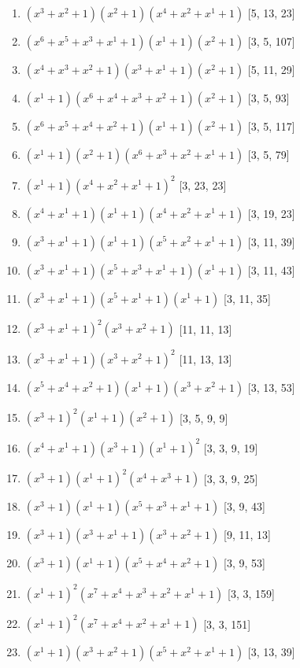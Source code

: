 \documentclass[10pt,twocolumn]{article}
\begin{document}
\begin{enumerate}
\item $(x^{3} + x^{2} + 1)(x^{2} + 1)(x^{4} + x^{2} + x^{1} + 1)$  [5, 13, 23]
\item $(x^{6} + x^{5} + x^{3} + x^{1} + 1)(x^{1} + 1)(x^{2} + 1)$  [3, 5, 107]
\item $(x^{4} + x^{3} + x^{2} + 1)(x^{3} + x^{1} + 1)(x^{2} + 1)$  [5, 11, 29]
\item $(x^{1} + 1)(x^{6} + x^{4} + x^{3} + x^{2} + 1)(x^{2} + 1)$  [3, 5, 93]
\item $(x^{6} + x^{5} + x^{4} + x^{2} + 1)(x^{1} + 1)(x^{2} + 1)$  [3, 5, 117]
\item $(x^{1} + 1)(x^{2} + 1)(x^{6} + x^{3} + x^{2} + x^{1} + 1)$  [3, 5, 79]
\item $(x^{1} + 1)(x^{4} + x^{2} + x^{1} + 1)^{2}$  [3, 23, 23]
\item $(x^{4} + x^{1} + 1)(x^{1} + 1)(x^{4} + x^{2} + x^{1} + 1)$  [3, 19, 23]
\item $(x^{3} + x^{1} + 1)(x^{1} + 1)(x^{5} + x^{2} + x^{1} + 1)$  [3, 11, 39]
\item $(x^{3} + x^{1} + 1)(x^{5} + x^{3} + x^{1} + 1)(x^{1} + 1)$  [3, 11, 43]
\item $(x^{3} + x^{1} + 1)(x^{5} + x^{1} + 1)(x^{1} + 1)$  [3, 11, 35]
\item $(x^{3} + x^{1} + 1)^{2}(x^{3} + x^{2} + 1)$  [11, 11, 13]
\item $(x^{3} + x^{1} + 1)(x^{3} + x^{2} + 1)^{2}$  [11, 13, 13]
\item $(x^{5} + x^{4} + x^{2} + 1)(x^{1} + 1)(x^{3} + x^{2} + 1)$  [3, 13, 53]
\item $(x^{3} + 1)^{2}(x^{1} + 1)(x^{2} + 1)$  [3, 5, 9, 9]
\item $(x^{4} + x^{1} + 1)(x^{3} + 1)(x^{1} + 1)^{2}$  [3, 3, 9, 19]
\item $(x^{3} + 1)(x^{1} + 1)^{2}(x^{4} + x^{3} + 1)$  [3, 3, 9, 25]
\item $(x^{3} + 1)(x^{1} + 1)(x^{5} + x^{3} + x^{1} + 1)$  [3, 9, 43]
\item $(x^{3} + 1)(x^{3} + x^{1} + 1)(x^{3} + x^{2} + 1)$  [9, 11, 13]
\item $(x^{3} + 1)(x^{1} + 1)(x^{5} + x^{4} + x^{2} + 1)$  [3, 9, 53]
\item $(x^{1} + 1)^{2}(x^{7} + x^{4} + x^{3} + x^{2} + x^{1} + 1)$  [3, 3, 159]
\item $(x^{1} + 1)^{2}(x^{7} + x^{4} + x^{2} + x^{1} + 1)$  [3, 3, 151]
\item $(x^{1} + 1)(x^{3} + x^{2} + 1)(x^{5} + x^{2} + x^{1} + 1)$  [3, 13, 39]

\end{enumerate}
\end{document}
